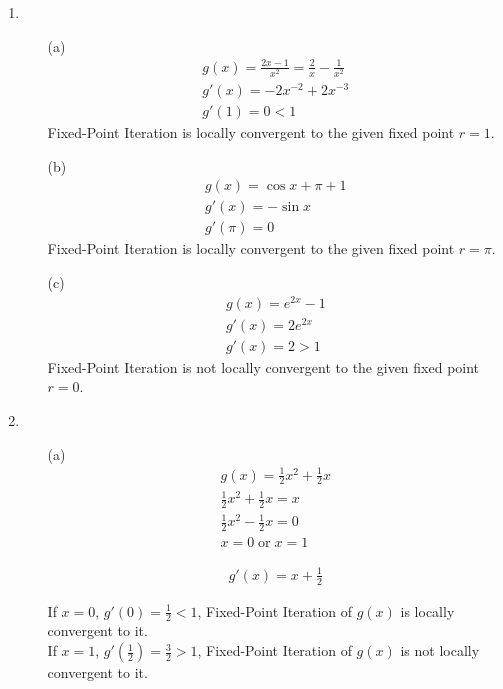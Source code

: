 \documentclass[UTF8]{ctexart}
\begin{document}
\begin{enumerate}
\begin{itemize}
\end{itemize}

\item \begin{itemize}
\item[(a)]
\begin{gather*}
g(x) = \frac{2x - 1}{x^2} = \frac{2}{x} - \frac{1}{x^2} \\
g'(x) = -2x^{-2} + 2x^{-3} \\
g'(1) = 0 < 1
\end{gather*}
Fixed-Point Iteration is locally convergent to the given fixed point $r=1$.

\item[(b)]
\begin{gather*}
g(x) = \cos x + \pi + 1 \\
g'(x) = -\sin x \\
g'(\pi) = 0
\end{gather*}
Fixed-Point Iteration is locally convergent to the given fixed point $r=\pi$.

\item[(c)]
\begin{gather*}
g(x) = e^{2x} - 1 \\
g'(x) = 2e^{2x} \\
g'(x) = 2 > 1
\end{gather*}
Fixed-Point Iteration is not locally convergent to the given fixed point $r=0$.

\end{itemize}

\item \begin{itemize}
\item[(a)]
\begin{gather*}
	g(x) = \frac{1}{2}x^2 + \frac{1}{2}x \\
	\frac{1}{2}x^2 + \frac{1}{2}x = x \\
	\frac{1}{2}x^2 - \frac{1}{2}x = 0 \\
	x = 0 \; \text{or} \; x = 1
\end{gather*}

\begin{gather*}
g'(x) = x + \frac{1}{2}
\end{gather*}

If $x = 0$, $g'(0) = \frac{1}{2} < 1$, Fixed-Point Iteration of $g(x)$ is locally convergent to it. \\
If $x = 1$, $g'(\frac{1}{2}) = \frac{3}{2} > 1$, Fixed-Point Iteration of $g(x)$ is not locally convergent to it.


\end{itemize}
\end{enumerate}
\end{document}
